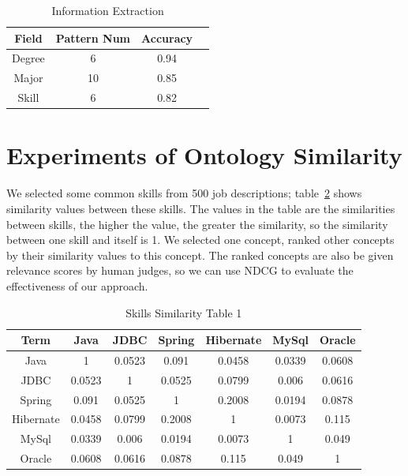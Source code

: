 \begin{table}[ht]
\caption{Information Extraction} %
\centering %
\begin{tabular}{   | c | c | c | c |   }
 \hline
                     Field   & Pattern Num & Accuracy     \\
 \hline
                     Degree & 6         & 0.94         \\
 \hline
                     Major  & 10        & 0.85      \\
 \hline
                     Skill  & 6         & 0.82      \\
 \hline
\end{tabular}
\label{tab:ieaccura} %
\end{table}

\section{Experiments of Ontology Similarity}

We selected some common skills from 500 job descriptions; table~\ref{tab:dismatrix3} shows similarity values between these skills. The values in the table are the similarities between skills, the higher the value, the greater the similarity, so the similarity between one skill and itself is 1. We selected one concept, ranked other concepts by their similarity values to this concept. The ranked concepts are also be given relevance scores by human judges, so we can use NDCG to evaluate the effectiveness of our approach.

\begin{table}

\caption{Skills Similarity Table 1}
\begin{tabular}{ c | c c c c c c   }
 \hline
  Term       &  Java  &  JDBC  & Spring & Hibernate & MySql  & Oracle   \\  \hline
  Java   &   1    & 0.0523 & 0.091  &   0.0458  & 0.0339 & 0.0608    \\  \hline
    JDBC   & 0.0523 &   1    & 0.0525 &   0.0799  & 0.006  & 0.0616   \\  \hline
   Spring  & 0.091  & 0.0525 &   1    &   0.2008  & 0.0194 & 0.0878   \\  \hline
 Hibernate & 0.0458 & 0.0799 & 0.2008 &     1     & 0.0073 & 0.115    \\  \hline
   MySql   & 0.0339 & 0.006  & 0.0194 &   0.0073  &   1    & 0.049    \\  \hline
   Oracle  & 0.0608 & 0.0616 & 0.0878 &   0.115   & 0.049  &   1      \\  \hline
 \hline
\end{tabular}
\label{tab:dismatrix3}
\end{table}

